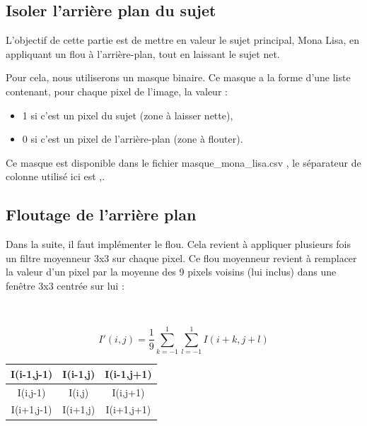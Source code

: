 \subsection{Isoler l'arrière plan du sujet}

L’objectif de cette partie est de mettre en valeur le sujet principal, Mona Lisa, en appliquant un flou à l’arrière-plan, tout en laissant le sujet net.

Pour cela, nous utiliserons un masque binaire. Ce masque a la forme d'une liste contenant, pour chaque pixel de l'image, la valeur :
\begin{itemize}
 \item 1 si c'est un pixel du sujet (zone à laisser nette),
 \item 0 si c'est un pixel de l’arrière-plan (zone à flouter).
\end{itemize}

Ce masque est disponible dans le fichier \og masque\_mona\_lisa.csv \fg, le séparateur de colonne utilisé ici est \og,\fg.


\subsection{Floutage de l'arrière plan}

Dans la suite, il faut implémenter le flou. Cela revient à appliquer plusieurs fois un filtre moyenneur 3x3 sur chaque pixel. Ce flou moyenneur revient à remplacer la valeur d'un pixel par la moyenne des 9 pixels voisins (lui inclus) dans une fenêtre 3x3 centrée sur lui :

~\ \\

\begin{minipage}{0.45\linewidth}
\[
I'(i,j)
=
\frac{1}{9}
\sum_{k=-1}^{1}
\sum_{l=-1}^{1}
I(i+k, j+l)
\]
\end{minipage}\hfill
\begin{minipage}{0.45\linewidth}
\renewcommand{\arraystretch}{2}  %
\begin{tabular}{|c|c|c|}
\hline
I(i-1,j-1) & I(i-1,j) & I(i-1,j+1)\\
\hline
I(i,j-1) & I(i,j) & I(i,j+1)\\
\hline
I(i+1,j-1) & I(i+1,j) & I(i+1,j+1)\\
\hline
\end{tabular}
\renewcommand{\arraystretch}{1}  %
\end{minipage}

